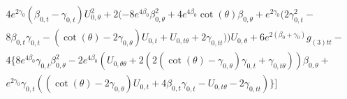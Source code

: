 \documentclass[a4paper,11pt]{article}
\numberwithin{equation}{section}
\begin{document}
\begin{align}
\begin{split}
&4 e^{2 \gamma_{0}} (\beta_{0, t }-\gamma_{0, t }) U_{0, \theta}^2+2 (-8 e^{4 \beta_{0}} \beta_{0, \theta}^2+4 e^{4 \beta_{0}} \cot (\theta ) \beta_{0, \theta}+e^{2 \gamma_{0}} (2 \gamma_{0, t }^2-\\
&8 \beta_{0, t } \gamma_{0, t }-(\cot (\theta )-2 \gamma_{0, \theta}) U_{0, t }+U_{0, t \theta}+2 \gamma_{0, t t})) U_{0, \theta}+6 e^{2 (\beta_{0}+\gamma_{0})} g_{(3)tt}-\\
&4 \{8 e^{4 \beta_{0}} \gamma_{0, t } \beta_{0, \theta}^2-2 e^{4 \beta_{0}} (U_{0, \theta \theta}+2 (2 (\cot (\theta )-\gamma_{0, \theta}) \gamma_{0, t }+\gamma_{0, t \theta})) \beta_{0, \theta}+\\
&e^{2 \gamma_{0}} \gamma_{0, t } ((\cot (\theta )-2 \gamma_{0, \theta}) U_{0, t }+4 \beta_{0, t } \gamma_{0, t }-U_{0, t \theta}-2 \gamma_{0, t t})\}]
\end{split}
\end{align}
\end{document}
